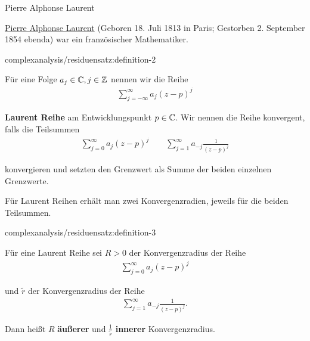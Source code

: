\begin{emphBox}{Pierre Alphonse Laurent}{}

\par
\href{https://de.wikipedia.org/wiki/Pierre\_Alphonse\_Laurent}{Pierre Alphonse Laurent} (Geboren 18. Juli 1813 in Paris; Gestorben 2. September 1854 ebenda) war ein französischer Mathematiker.
\end{emphBox}
\begin{definition}{}{complexanalysis/residuensatz:definition-2}



\par
Für eine Folge \(a_j\in\mathbb{C}, j\in \mathbb{Z}\) nennen wir die Reihe
\begin{align*}
\sum_{j=-\infty}^\infty a_j (z-p)^j
\end{align*}
\par
\textbf{Laurent Reihe} am Entwicklungspunkt \(p\in\mathbb{C}\). Wir nennen die Reihe konvergent, falls die Teilsummen
\begin{align*}
\sum_{j=0}^\infty a_j (z-p)^j\qquad \sum_{j=1}^\infty a_{-j} \frac{1}{(z-p)^j}
\end{align*}
\par
konvergieren und setzten den Grenzwert als Summe der beiden einzelnen Grenzwerte.
\end{definition}

\par
Für Laurent Reihen erhält man zwei Konvergenzradien, jeweils für die beiden Teilsummen.
\begin{definition}{}{complexanalysis/residuensatz:definition-3}



\par
Für eine Laurent Reihe sei \(R>0\) der Konvergenzradius der Reihe
\begin{align*}
\sum_{j=0}^\infty a_j (z-p)^j
\end{align*}
\par
und \(\tilde{r}\) der Konvergenzradius der Reihe
\begin{align*}
\sum_{j=1}^\infty a_{-j} \frac{1}{(z-p)^j}.
\end{align*}
\par
Dann heißt \(R\) \textbf{äußerer} und \(\frac{1}{\tilde{r}}\) \textbf{innerer} Konvergenzradius.
\end{definition}

